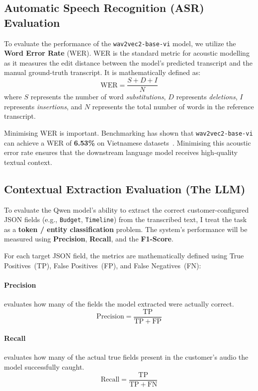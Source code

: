 \documentclass[ 
  journal=medium,
  manuscript={Contextual Information Extraction of Customer Data from Sales audio calls},
  year=2026,
  volume=0,
]{cup-journal}
\begin{document}
\subsection{Automatic Speech Recognition (ASR) Evaluation}
To evaluate the performance of the \texttt{wav2vec2-base-vi} model, we utilize the \textbf{Word Error Rate} (WER).
WER is the standard metric for acoustic modelling~\cite{wikipedia_wer} as it measures the edit distance between the model's predicted transcript and the manual ground-truth transcript.
It is mathematically defined as:
\begin{equation}
  \mathrm{WER} = \frac{S + D + I}{N}
  \label{eq:wer}
\end{equation}
where $S$ represents the number of word \emph{substitutions}, $D$ represents \emph{deletions}, $I$ represents \emph{insertions}, and $N$ represents the total number of words in the reference transcript.

Minimising WER is important. Benchmarking has shown that \texttt{wav2vec2-base-vi} can achieve a WER of \textbf{6.53\%} on Vietnamese datasets~\cite{nguyenvulebinh_wav2vec2_base_vi}.
Minimising this acoustic error rate ensures that the downstream language model receives high-quality textual context.

\subsection{Contextual Extraction Evaluation (The LLM)}
To evaluate the Qwen model's ability to extract the correct customer-configured JSON fields (e.g., \texttt{Budget}, \texttt{Timeline}) from the transcribed text, I treat the task as a \textbf{token / entity classification} problem.
The system's performance will be measured using \textbf{Precision}, \textbf{Recall}, and the \textbf{F1-Score}.

For each target JSON field, the metrics are mathematically defined using True Positives~(TP), False Positives~(FP), and False Negatives~(FN):

\paragraph{Precision} evaluates how many of the fields the model extracted were actually correct.
\begin{equation}
  \mathrm{Precision} = \frac{\mathrm{TP}}{\mathrm{TP} + \mathrm{FP}}
  \label{eq:precision}
\end{equation}

\paragraph{Recall} evaluates how many of the actual true fields present in the customer's audio the model successfully caught.
\begin{equation}
  \mathrm{Recall} = \frac{\mathrm{TP}}{\mathrm{TP} + \mathrm{FN}}
  \label{eq:recall}
\end{equation}
\end{document}
